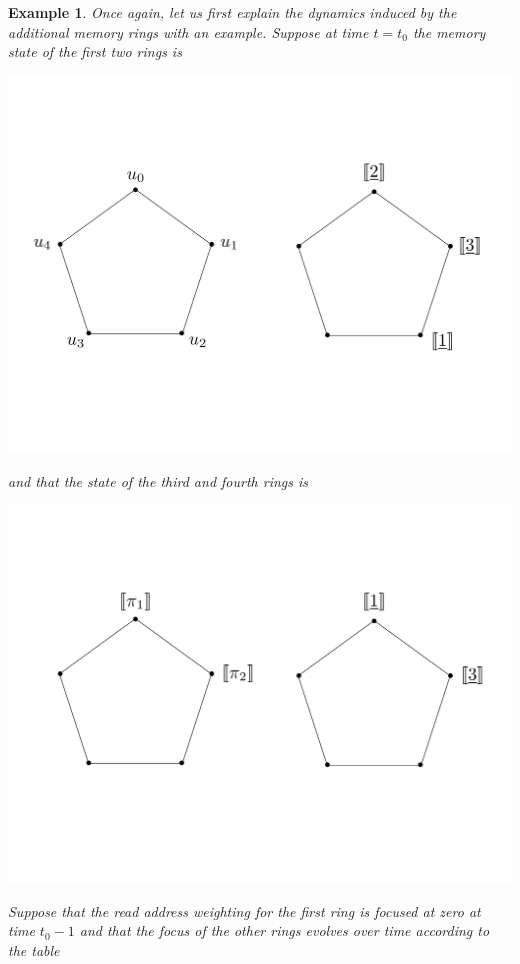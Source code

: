 \documentclass[english,letter paper,12pt,leqno]{article}
\theoremstyle{example}
\newtheorem{example}[theorem]{Example}
\numberwithin{equation}{section}
\begin{document}
\begin{example}
Once again, let us first explain the dynamics induced by the additional memory rings with an example. Suppose at time $t = t_0$ the memory state of the first two rings is
\begin{center}
\includegraphics[scale=0.3]{dia2}
\end{center}
and that the state of the third and fourth rings is
\begin{center}
\includegraphics[scale=0.3]{dia3}
\end{center}
Suppose that the read address weighting for the first ring is focused at zero at time $t_0 -1$ and that the focus of the other rings evolves over time according to the table
\begin{center}
\begin{tabular}{|r|c|c|c|c|c|c|c|}

\end{tabular}
\end{center}
\end{example}
\end{document}

